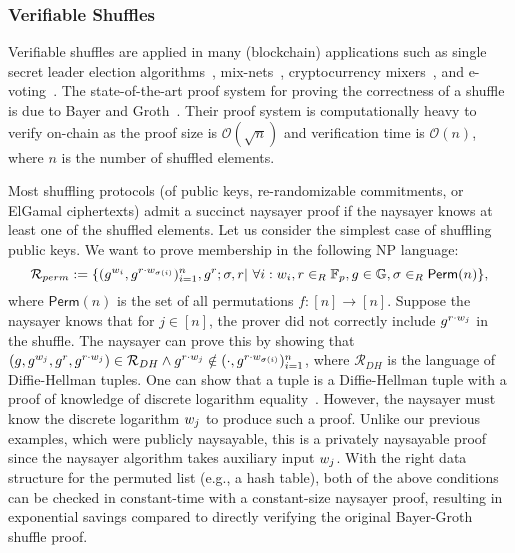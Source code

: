 \subsubsection{Verifiable Shuffles}\label{sec:vshuffle_naysayer}
Verifiable shuffles are applied in many (blockchain) applications such as single secret leader election algorithms~\cite{AFT:Boneh20}, mix-nets~\cite{CACM:Chaum81}, cryptocurrency mixers~\cite{EPRINT:SNBB19}, and e-voting~\cite{USENIX:Adida08}. The state-of-the-art proof system for proving the correctness of a shuffle is due to Bayer and Groth~\cite{EC:BayGro12}. Their proof system is computationally heavy to verify on-chain as the proof size is $\mathcal{O}(\sqrt{n})$ and verification time is $\mathcal{O}(n)$, where $n$ is the number of shuffled elements. 

Most shuffling protocols (of public keys, re-randomizable commitments, or ElGamal ciphertexts) admit a succinct naysayer proof if the naysayer knows at least one of the shuffled elements. Let us consider the simplest case of shuffling public keys. We want to prove membership in the following  NP language:
\begin{equation}\label{eq:permlanguage}
    \mathcal{R}_{perm}:=\{(g^{w_i},g^{r\cdot w_{\sigma(i)}})^{n}_{i=1},g^r;\sigma,r\vert\ \forall i:w_i,r\in_{R}\mathbb{F}_p,g\in\mathbb{G},  \sigma\in_{R}\mathsf{Perm}(n)\}, 
\end{equation}
where $\mathsf{Perm}(n)$ is the set of all permutations $f:[n]\rightarrow[n]$.
Suppose the naysayer knows that for $j\in[n]$, the prover did not correctly include $g^{r\cdot w_j}$ in the shuffle. The naysayer can prove this by showing that $(g,g^{w_j},g^r,g^{r\cdot w_j})\in\mathcal{R}_{DH}\land g^{r\cdot w_j}\notin (\cdot,g^{r\cdot w_{\sigma(i)}})^n_{i=1}$, where $\mathcal{R}_{DH}$ is the language of Diffie-Hellman tuples. One can show that a tuple is a Diffie-Hellman tuple with a proof of knowledge of discrete logarithm equality~\cite{C:ChaPed92}. However, the naysayer must know the discrete logarithm $w_j$ to produce such a proof. Unlike our previous examples, which were publicly naysayable, this is a privately naysayable proof since the naysayer algorithm takes auxiliary input $w_j$. With the right data structure for the permuted list (e.g., a hash table), both of the above conditions can be checked in constant-time with a constant-size naysayer proof, resulting in exponential savings compared to directly verifying the original Bayer-Groth shuffle proof.

